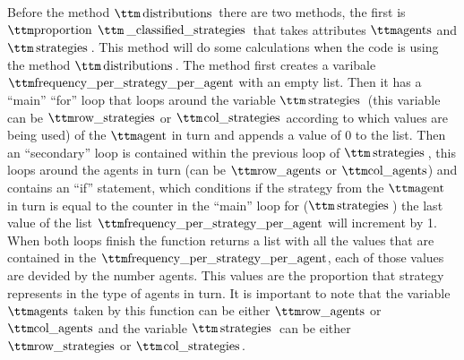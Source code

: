 Before the method $\pythoninline{distributions}$ there are two methods, the first is $\pythoninline{proportion}$ $\pythoninline{\_classified\_strategies}$ that takes attributes $\pythoninline{agents}$ and $\pythoninline{strategies}$. This method will do some calculations when the code is using the method $\pythoninline{distributions}$.   The method first creates a varibale $\pythoninline{frequency\_per\_strategy\_per\_agent}$ with an empty list. Then it has a ``main'' ``for'' loop that loops around the variable $\pythoninline{strategies}$ (this variable can be $\pythoninline{row\_strategies}$ or $\pythoninline{col\_strategies}$ according to which values are being used) of the $\pythoninline{agent}$ in turn and appends a value of 0 to the list. Then an ``secondary'' loop is contained within the previous loop of $\pythoninline{strategies}$, this loops around the agents in turn (can be $\pythoninline{row\_agents}$ or $\pythoninline{col\_agents}$) and contains an ``if'' statement, which conditions if  the strategy from the $\pythoninline{agent}$ in turn is equal to the counter in the ``main'' loop for ($\pythoninline{strategies}$) the last value of the list $\pythoninline{frequency\_per\_strategy\_per\_agent}$ will increment by 1. When both loops finish the function returns a list with all the values that are contained in the $\pythoninline{frequency\_per\_strategy\_per\_agent}$, each of those values are devided by the number agents. This values are the proportion that strategy represents in the type of agents in turn. It is important to note that the variable $\pythoninline{agents}$ taken by this function can be either $\pythoninline{row\_agents}$ or $\pythoninline{col\_agents}$   and the variable $\pythoninline{strategies}$ can be either $\pythoninline{row\_strategies}$ or $\pythoninline{col\_strategies}$. 

